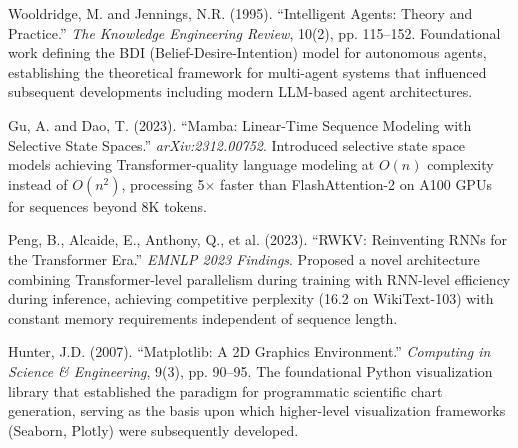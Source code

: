 \begin{enumerate}[label={[\arabic*]}, leftmargin=2cm]
\item Wooldridge, M. and Jennings, N.R. (1995). ``Intelligent Agents: Theory and Practice.'' \textit{The Knowledge Engineering Review}, 10(2), pp. 115--152. Foundational work defining the BDI (Belief-Desire-Intention) model for autonomous agents, establishing the theoretical framework for multi-agent systems that influenced subsequent developments including modern LLM-based agent architectures.

\item Gu, A. and Dao, T. (2023). ``Mamba: Linear-Time Sequence Modeling with Selective State Spaces.'' \textit{arXiv:2312.00752}. Introduced selective state space models achieving Transformer-quality language modeling at $O(n)$ complexity instead of $O(n^2)$, processing 5$\times$ faster than FlashAttention-2 on A100 GPUs for sequences beyond 8K tokens.

\item Peng, B., Alcaide, E., Anthony, Q., et al. (2023). ``RWKV: Reinventing RNNs for the Transformer Era.'' \textit{EMNLP 2023 Findings}. Proposed a novel architecture combining Transformer-level parallelism during training with RNN-level efficiency during inference, achieving competitive perplexity (16.2 on WikiText-103) with constant memory requirements independent of sequence length.

\item Hunter, J.D. (2007). ``Matplotlib: A 2D Graphics Environment.'' \textit{Computing in Science \& Engineering}, 9(3), pp. 90--95. The foundational Python visualization library that established the paradigm for programmatic scientific chart generation, serving as the basis upon which higher-level visualization frameworks (Seaborn, Plotly) were subsequently developed.

\end{enumerate}
